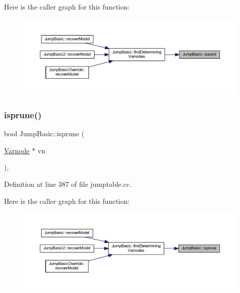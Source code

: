 Here is the caller graph for this function\+:
\nopagebreak
\begin{figure}[H]
\begin{center}
\leavevmode
\includegraphics[width=350pt]{class_jump_basic_a1a00a767da59463a1b552a9fc6760156_icgraph}
\end{center}
\end{figure}
\mbox{\label{class_jump_basic_adfafb975d3e72f1ebe55f8dd6544fd44}} 
\subsubsection{\texorpdfstring{isprune()}{isprune()}}
{\footnotesize\ttfamily bool Jump\+Basic\+::isprune (\begin{DoxyParamCaption}\item[{\mbox{\hyperlink{class_varnode}{Varnode}} $\ast$}]{vn }\end{DoxyParamCaption})\hspace{0.3cm}{\ttfamily [static]}, {\ttfamily [protected]}}



Definition at line 387 of file jumptable.\+cc.

Here is the caller graph for this function\+:
\nopagebreak
\begin{figure}[H]
\begin{center}
\leavevmode
\includegraphics[width=350pt]{class_jump_basic_adfafb975d3e72f1ebe55f8dd6544fd44_icgraph}
\end{center}
\end{figure}
\mbox{\label{class_jump_basic_a8a8537f11c7ee4431d0b7ccce30d3241}} 
